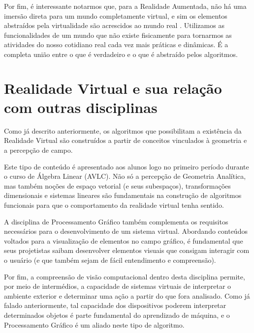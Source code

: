 \documentclass[a4paper, 10pt]{article}
\begin{document}
Por fim, é interessante notarmos que, para a Realidade Aumentada, não há uma imersão direta para um mundo completamente virtual, e sim os elementos abstraídos pela virtualidade são acrescidos ao mundo real \citep{liberati2018}. Utilizamos as funcionalidades de um mundo que não existe fisicamente para tornarmos as atividades do nosso cotidiano real cada vez mais práticas e dinâmicas. É a completa união entre o que é verdadeiro e o que é abstraído pelos algoritmos. 

\section{Realidade Virtual e sua relação com outras disciplinas}
Como já descrito anteriormente, os algoritmos que possibilitam a existência da Realidade Virtual são construídos a partir de conceitos vinculados à geometria e a percepção de campo. 

Este tipo de conteúdo é apresentado aos alunos logo no primeiro período durante o curso de Álgebra Linear (AVLC). Não só a percepção de Geometria Analítica, mas também noções de espaço vetorial (e seus subespaços), transformações dimensionais e sistemas lineares são fundamentais na construção de algoritmos funcionais para que o comportamento da realidade virtual tenha sentido. 

A disciplina de Processamento Gráfico também complementa os requisitos necessários para o desenvolvimento de um sistema virtual. Abordando conteúdos voltados para a visualização de elementos no campo gráfico, é fundamental que seus projetistas saibam desenvolver elementos visuais que consigam interagir com o usuário (e que também sejam de fácil entendimento e compreensão). 

Por fim, a compreensão de visão computacional dentro desta disciplina permite, por meio de intermédios, a capacidade de sistemas virtuais de interpretar o ambiente exterior e determinar uma ação a partir do que fora analisado. Como já falado anteriormente, tal capacidade dos dispositivos poderem interpretar determinados objetos é parte fundamental do aprendizado de máquina, e o Processamento Gráfico é um aliado neste tipo de algoritmo.

\newpage


\end{document}
